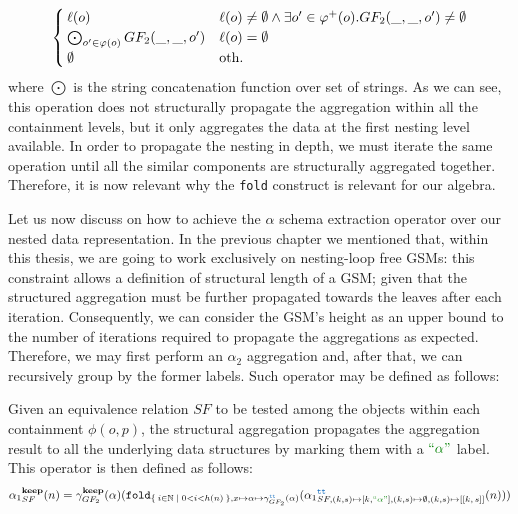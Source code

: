 \begin{example}[continues=ex:aggregations,label=ex:aggregations2]
\[\begin{cases}
\ell(o) & \ell(o)\neq\emptyset \wedge \exists o'\in\varphi^+(o). GF_2(\_,\_,o')\neq\emptyset \\
\bigodot_{o'\in\varphi(o)}GF_2(\_,\_,o') & \ell(o)=\emptyset\\
\emptyset & \textup{oth.}\\
\end{cases}\]
where $\bigodot$ is the string concatenation function over set of strings.
As we can see, this operation does not structurally propagate the aggregation within all the containment levels, but it only aggregates the data at the first nesting level available. In order to propagate the nesting in depth, we must iterate the same operation until all the similar components are structurally aggregated together. Therefore, it is now relevant why the \texttt{fold} construct is relevant for our algebra.
\end{example}


\label{abstractionAlpha1}

Let us now discuss on how to achieve the $\alpha$ schema extraction operator over our nested data representation. In the previous chapter we mentioned that, within this thesis, we are going to work exclusively on nesting-loop free GSMs: this constraint allows a definition of structural length of a GSM; given that the structured aggregation must be further propagated towards the leaves after each iteration. Consequently, we can consider the GSM's height as an upper bound to the number of iterations required to propagate the aggregations as expected. Therefore, we may first perform an $\alpha_2$ aggregation and, after that, we can recursively group by the former labels. Such operator may be defined as follows:



\begin{definition}
	Given an equivalence relation $SF$ to be tested among the objects within each containment $\phi(o,p)$, the structural aggregation propagates the aggregation result to all the underlying data structures by marking them with a $\hstr{\alpha}$ label. This operator is then defined as follows:
	\[{\alpha_1}_{SF}^{\textbf{keep}}(n)=\gamma_{GF_2}^{\textbf{keep}}(\alpha)(\texttt{fold}_{\Set{i\in \nat|0<i< h(n)},x\mapsto\alpha\mapsto \gamma_{GF_2}^{{\color{RoyalBlue}\texttt{tt}}}(\alpha)}({\alpha_1}_{SF,(k,s)\mapsto [k,\hstr{\alpha}], (k,s)\mapsto \emptyset, (k,s)\mapsto[[k,\, s]]}^{{\color{RoyalBlue}\texttt{tt}}}(n)))\]
\end{definition}

